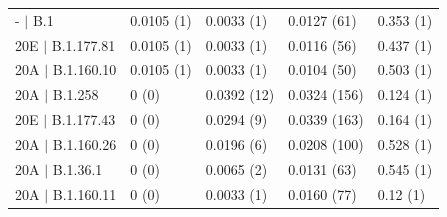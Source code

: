 \begin{table}[ht]
\begin{tabular}{lllll}
  - $|$ B.1 & 0.0105 (1) & 0.0033 (1) & 0.0127 (61) & 0.353 (1) \\ 
  20E $|$ B.1.177.81 & 0.0105 (1) & 0.0033 (1) & 0.0116 (56) & 0.437 (1) \\ 
  20A $|$ B.1.160.10 & 0.0105 (1) & 0.0033 (1) & 0.0104 (50) & 0.503 (1) \\ 
  20A $|$ B.1.258 & 0 (0) & 0.0392 (12) & 0.0324 (156) & 0.124 (1) \\ 
  20E $|$ B.1.177.43 & 0 (0) & 0.0294 (9) & 0.0339 (163) & 0.164 (1) \\ 
  20A $|$ B.1.160.26 & 0 (0) & 0.0196 (6) & 0.0208 (100) & 0.528 (1) \\ 
  20A $|$ B.1.36.1 & 0 (0) & 0.0065 (2) & 0.0131 (63) & 0.545 (1) \\ 
  20A $|$ B.1.160.11 & 0 (0) & 0.0033 (1) & 0.0160 (77) & 0.12 (1) \\ 
   \hline
\end{tabular}
\end{table}
